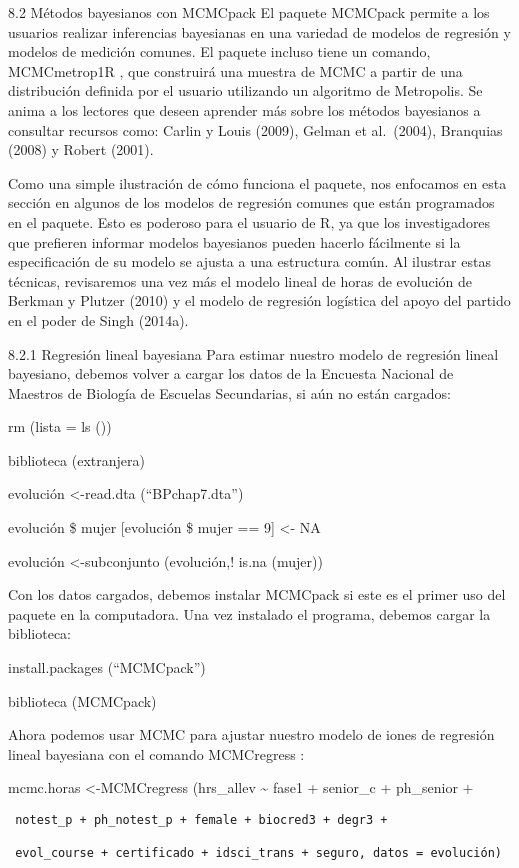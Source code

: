 \documentclass[
]{book}
\begin{document}
8.2 Métodos bayesianos con MCMCpack
El paquete MCMCpack permite a los usuarios realizar inferencias bayesianas en una variedad de modelos de regresión y modelos de medición comunes. El paquete incluso tiene un comando, MCMCmetrop1R , que construirá una muestra de MCMC a partir de una distribución definida por el usuario utilizando un algoritmo de Metropolis. Se anima a los lectores que deseen aprender más sobre los métodos bayesianos a consultar recursos como: Carlin y Louis (2009), Gelman et al.~(2004), Branquias (2008) y Robert (2001).

Como una simple ilustración de cómo funciona el paquete, nos enfocamos en esta sección en algunos de los modelos de regresión comunes que están programados en el paquete. Esto es poderoso para el usuario de R, ya que los investigadores que prefieren informar modelos bayesianos pueden hacerlo fácilmente si la especificación de su modelo se ajusta a una estructura común. Al ilustrar estas técnicas, revisaremos una vez más el modelo lineal de horas de evolución de Berkman y Plutzer (2010) y el modelo de regresión logística del apoyo del partido en el poder de Singh (2014a).

8.2.1 Regresión lineal bayesiana
Para estimar nuestro modelo de regresión lineal bayesiano, debemos volver a cargar los datos de la Encuesta Nacional de Maestros de Biología de Escuelas Secundarias, si aún no están cargados:

rm (lista = ls ())

biblioteca (extranjera)

evolución \textless-read.dta (``BPchap7.dta'')

evolución \$ mujer {[}evolución \$ mujer == 9{]} \textless- NA

evolución \textless-subconjunto (evolución,! is.na (mujer))

Con los datos cargados, debemos instalar MCMCpack si este es el primer uso del paquete en la computadora. Una vez instalado el programa, debemos cargar la biblioteca:

install.packages (``MCMCpack'')

biblioteca (MCMCpack)

Ahora podemos usar MCMC para ajustar nuestro modelo de iones de regresión lineal bayesiana con el comando MCMCregress :

mcmc.horas \textless-MCMCregress (hrs\_allev \textasciitilde{} fase1 + senior\_c + ph\_senior +

\begin{verbatim}
 notest_p + ph_notest_p + female + biocred3 + degr3 +

 evol_course + certificado + idsci_trans + seguro, datos = evolución)
\end{verbatim}
\end{document}
